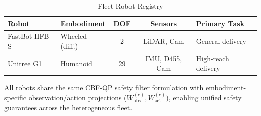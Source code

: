 \documentclass[conference]{IEEEtran}
\begin{document}
\begin{table}[h]
\centering
\caption{Fleet Robot Registry}
\begin{tabular}{@{}llccl@{}}
\toprule
\textbf{Robot} & \textbf{Embodiment} & \textbf{DOF} & \textbf{Sensors} & \textbf{Primary Task} \\
\midrule
FastBot HFB-S    & Wheeled (diff.) & 2  & LiDAR, Cam     & General delivery \\
Unitree G1       & Humanoid        & 29 & IMU, D455, Cam & High-reach delivery \\
\bottomrule
\end{tabular}
\end{table}

All robots share the same CBF-QP safety filter formulation with embodiment-specific observation/action projections ($W_\text{obs}^{(e)}, W_\text{act}^{(e)}$), enabling unified safety guarantees across the heterogeneous fleet.
\end{document}
